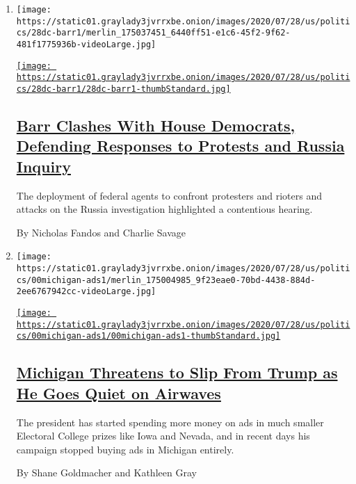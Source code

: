 \begin{enumerate}
\def\labelenumi{\arabic{enumi}.}
\item
  \texttt{[image: https://static01.graylady3jvrrxbe.onion/images/2020/07/28/us/politics/28dc-barr1/merlin\_175037451\_6440ff51-e1c6-45f2-9f62-481f1775936b-videoLarge.jpg]}

  \href{/2020/07/28/us/politics/barr-testimony.html}{\texttt{[image: https://static01.graylady3jvrrxbe.onion/images/2020/07/28/us/politics/28dc-barr1/28dc-barr1-thumbStandard.jpg]}}

  \hypertarget{barr-clashes-with-house-democrats-defending-responses-to-protests-and-russia-inquiry}{%
  \subsection{\texorpdfstring{\href{/2020/07/28/us/politics/barr-testimony.html}{Barr
  Clashes With House Democrats, Defending Responses to Protests and
  Russia
  Inquiry}}{Barr Clashes With House Democrats, Defending Responses to Protests and Russia Inquiry}}\label{barr-clashes-with-house-democrats-defending-responses-to-protests-and-russia-inquiry}}

  The deployment of federal agents to confront protesters and rioters
  and attacks on the Russia investigation highlighted a contentious
  hearing.

  By Nicholas Fandos and Charlie Savage
\item
  \texttt{[image: https://static01.graylady3jvrrxbe.onion/images/2020/07/28/us/politics/00michigan-ads1/merlin\_175004985\_9f23eae0-70bd-4438-884d-2ee6767942cc-videoLarge.jpg]}

  \href{/2020/07/29/us/politics/michigan-trump-biden-2020.html}{\texttt{[image: https://static01.graylady3jvrrxbe.onion/images/2020/07/28/us/politics/00michigan-ads1/00michigan-ads1-thumbStandard.jpg]}}

  \hypertarget{michigan-threatens-to-slip-from-trump-as-he-goes-quiet-on-airwaves}{%
  \subsection{\texorpdfstring{\href{/2020/07/29/us/politics/michigan-trump-biden-2020.html}{Michigan
  Threatens to Slip From Trump as He Goes Quiet on
  Airwaves}}{Michigan Threatens to Slip From Trump as He Goes Quiet on Airwaves}}\label{michigan-threatens-to-slip-from-trump-as-he-goes-quiet-on-airwaves}}

  The president has started spending more money on ads in much smaller
  Electoral College prizes like Iowa and Nevada, and in recent days his
  campaign stopped buying ads in Michigan entirely.

  By Shane Goldmacher and Kathleen Gray
\end{enumerate}

